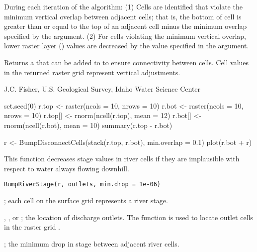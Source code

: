 \documentclass[a4paper]{book}
\begin{document}
%
\begin{Details}\relax
During each iteration of the algorithm:
(1) Cells are identified that violate the minimum vertical overlap between adjacent cells; that is, the bottom of cell  is greater than or equal to the top of an adjacent cell  minus the minimum overlap specified by the  argument.
(2) For cells violating the minimum vertical overlap, lower raster layer () values are decreased by the value specified in the  argument.
\end{Details}
%
\begin{Value}
Returns a  that can be added to  to ensure connectivity between cells.
Cell values in the returned raster grid represent vertical adjustments.
\end{Value}
%
\begin{Author}\relax
J.C. Fisher, U.S. Geological Survey, Idaho Water Science Center
\end{Author}
%
\begin{Examples}
\begin{ExampleCode}
set.seed(0)
r.top <- raster(ncols = 10, nrows = 10)
r.bot <- raster(ncols = 10, nrows = 10)
r.top[] <- rnorm(ncell(r.top), mean = 12)
r.bot[] <- rnorm(ncell(r.bot), mean = 10)
summary(r.top - r.bot)

r <- BumpDisconnectCells(stack(r.top, r.bot), min.overlap = 0.1)
plot(r.bot + r)
\end{ExampleCode}
\end{Examples}
%
\begin{Description}\relax
This function decreases stage values in river cells if they are implausible with respect to water always flowing downhill.
\end{Description}
%
\begin{Usage}
\begin{verbatim}
BumpRiverStage(r, outlets, min.drop = 1e-06)
\end{verbatim}
\end{Usage}
%
\begin{Arguments}
\begin{ldescription}
\item[\code{r}] ; each cell on the surface grid represents a river stage.
\item[\code{outlets}] , ,  or ; the location of discharge outlets.
The  function is used to locate outlet cells in the raster grid .
\item[\code{min.drop}] ; the minimum drop in stage between adjacent river cells.
\end{ldescription}
\end{Arguments}
\end{document}
